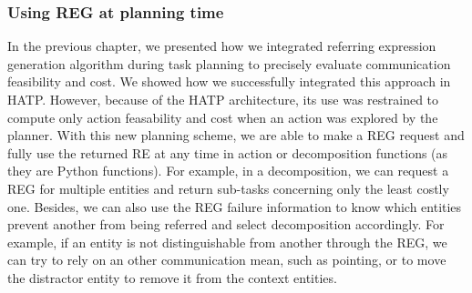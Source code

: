 \documentclass[a4paper,11pt,twoside]{StyleThese}
\begin{document}
\subsubsection{Using REG at planning time}
In the previous chapter, we presented how we integrated referring expression generation algorithm during task planning to precisely evaluate communication feasibility and cost. We showed how we successfully integrated this approach in HATP. However, because of the HATP architecture, its use was restrained to compute only action feasability and cost when an action was explored by the planner.
With this new planning scheme, we are able to make a REG request and fully use the returned RE at any time in action or decomposition functions (as they are Python functions). For example, in a decomposition, we can request a REG for multiple entities and return sub-tasks concerning only the least costly one. 
Besides, we can also use the REG failure information to know which entities prevent another from being referred and select decomposition accordingly. For example, if an entity is not distinguishable from another through the REG, we can try to rely on an other communication mean, such as pointing, or to move the distractor entity to remove it from the context entities.
\end{document}
